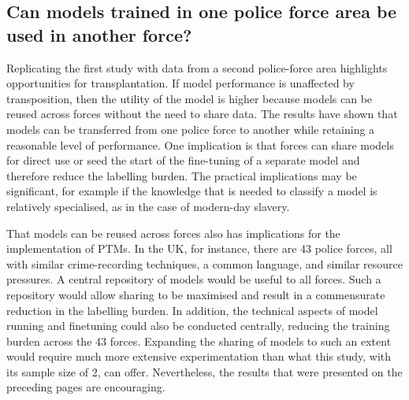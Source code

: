 \subsection{Can models trained in one police force area be used in another force?} Replicating the first study with data from a second police-force area highlights opportunities for transplantation. If model performance is unaffected by transposition, then the utility of the model is higher because models can be reused across forces without the need to share data. The results have shown that models can be transferred from one police force to another while retaining a reasonable level of performance. One implication is that forces can share models for direct use or seed the start of the fine-tuning of a separate model and therefore reduce the labelling burden. The practical implications may be significant, for example if the knowledge that is needed to classify a model is relatively specialised, as in the case of modern-day slavery.

That models can be reused across forces also has implications for the implementation of PTMs. In the UK, for instance, there are 43 police forces, all with similar crime-recording techniques, a common language, and similar resource pressures. A central repository of models would be useful to all forces. Such a repository would allow sharing to be maximised and result in a commensurate reduction in the labelling burden. In addition, the technical aspects of model running and finetuning could also be conducted centrally, reducing the training burden across the 43 forces. Expanding the sharing of models to such an extent would require much more extensive experimentation than what this study, with its sample size of 2, can offer. Nevertheless, the results that were presented on the preceding pages are encouraging.


